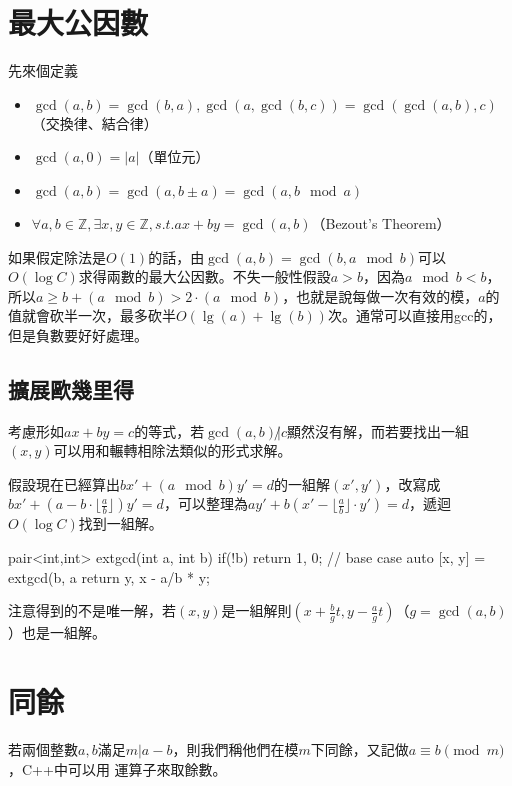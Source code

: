 \section{最大公因數}
先來個定義

\begin{itemize}
\item $\gcd(a,b) = \gcd(b,a), \gcd(a,\gcd(b,c)) = \gcd(\gcd(a,b), c)$（交換律、結合律）
\item $\gcd(a,0) = |a|$（單位元）
\item $\gcd(a,b) = \gcd(a, b \pm a) = \gcd(a, b \mod a)$
\item $\forall a,b \in \mathbb{Z} , \exists x,y \in \mathbb{Z}, s.t. ax+by = \gcd(a,b)$（Bezout's Theorem）
\end{itemize}

如果假定除法是$O(1)$的話，由$\gcd(a,b)=\gcd(b,a \mod b)$可以$O(\log C)$求得兩數的最大公因數。不失一般性假設$a>b$，因為$a \mod b < b$，所以$a \geq b+(a \mod b) > 2\cdot(a \mod b)$，也就是說每做一次有效的模，$a$的值就會砍半一次，最多砍半$O(\lg(a)+\lg(b))$次。通常可以直接用gcc的，但是負數要好好處理。

\subsection{擴展歐幾里得}
考慮形如$ax+by=c$的等式，若$\gcd(a,b) {\not |} c$顯然沒有解，而若要找出一組$(x,y)$可以用和輾轉相除法類似的形式求解。

假設現在已經算出$bx' + (a \mod b)y' = d$的一組解$(x', y')$，改寫成$bx' + (a - b \cdot \lfloor \frac{a}{b} \rfloor)y' = d$，可以整理為$ay' + b(x' - \lfloor \frac{a}{b} \rfloor \cdot y') = d$，遞迴$O(\log C)$找到一組解。

\begin{C++}
pair<int,int> extgcd(int a, int b) {
	if(!b) return {1, 0}; // base case
	auto [x, y] = extgcd(b, a%
	return {y, x - a/b * y};
}
\end{C++}
注意得到的不是唯一解，若$(x,y)$是一組解則$(x+\frac{b}{g}t, y-\frac{a}{g}t)$（$g=\gcd(a,b)$）也是一組解。

\section{同餘}
若兩個整數$a,b$滿足$m | a-b$，則我們稱他們在模$m$下同餘，又記做$a \equiv b \pmod m$，C++中可以用 \inline{\%} 運算子來取餘數。

